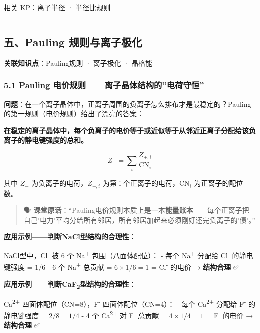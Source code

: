 相关 KP：离子半径 · 半径比规则

\begin{center}\rule{0.5\linewidth}{0.5pt}\end{center}

\subsection{五、Pauling 规则与离子极化}\label{ux4e94pauling-ux89c4ux5219ux4e0eux79bbux5b50ux6781ux5316}

\textbf{关联知识点}：Pauling规则 · 离子极化 · 晶格能

\subsubsection{5.1 Pauling 电价规则------离子晶体结构的''电荷守恒''}\label{pauling-ux7535ux4ef7ux89c4ux5219ux79bbux5b50ux6676ux4f53ux7ed3ux6784ux7684ux7535ux8377ux5b88ux6052}

\textbf{问题}：在一个离子晶体中，正离子周围的负离子怎么排布才是最稳定的？Pauling 的第一规则（电价规则）给出了漂亮的答案：

\textbf{在稳定的离子晶体中，每个负离子的电价等于或近似等于从邻近正离子分配给该负离子的静电键强度的总和。}

\[
Z_- = \sum_i \frac{Z_{+,i}}{\text{CN}_i}
\]

其中 \(Z_-\) 为负离子的电荷，\(Z_{+,i}\) 为第 i 个正离子的电荷，\(\text{CN}_i\) 为正离子的配位数。

\begin{quote}
🗣️ \textbf{课堂原话}：``Pauling电价规则本质上是一本\textbf{能量账本}------每个正离子把自己'电力'平均分给所有邻居，所有邻居加起来必须刚好还完负离子的'债'。''
\end{quote}

\textbf{应用示例------判断NaCl型结构的合理性}：

NaCl型中，Cl\textsuperscript{-} 被 6 个 Na\textsuperscript{+} 包围（八面体配位）：
- 每个 Na\textsuperscript{+} 分配给 Cl\textsuperscript{-} 的静电键强度 = \(1/6\)
- 6 个 Na\textsuperscript{+} 总贡献 = \(6 \times 1/6 = 1\) = Cl\textsuperscript{-} 的电价 → \textbf{结构合理} ✅

\textbf{应用示例------判断CaF\textsubscript{2}型结构的合理性}：

Ca\textsuperscript{2+} 四面体配位（CN=8），F\textsuperscript{-} 四面体配位（CN=4）：
- 每个 Ca\textsuperscript{2+} 分配给 F\textsuperscript{-} 的静电键强度 = \(2/8 = 1/4\)
- 4 个 Ca\textsuperscript{2+} 对 F\textsuperscript{-} 总贡献 = \(4 \times 1/4 = 1\) = F\textsuperscript{-} 的电价 → \textbf{结构合理} ✅

